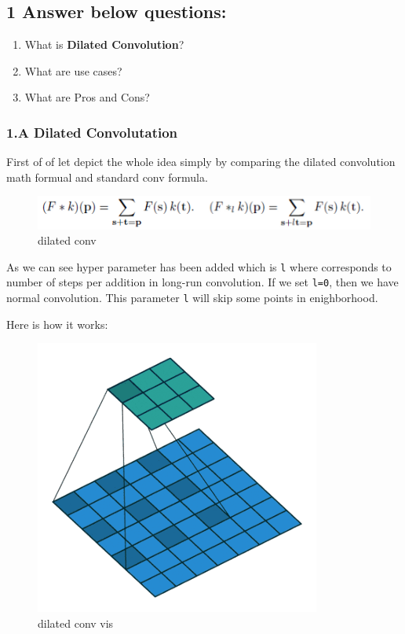 \documentclass[11pt]{article}
\makeatletter
\def\maxwidth{\ifdim\Gin@nat@width>\linewidth\linewidth
    \else\Gin@nat@width\fi}
\let\Oldincludegraphics\includegraphics
\renewcommand{\includegraphics}[1]{\Oldincludegraphics[width=.8\maxwidth]{#1}}
\providecommand{\tightlist}{%
      \setlength{\itemsep}{0pt}\setlength{\parskip}{0pt}}
\makeatother
\begin{document}
    \hypertarget{answer-below-questions}{%
\subsection{1 Answer below questions:}\label{answer-below-questions}}

\begin{enumerate}
\def\labelenumi{\arabic{enumi}.}
\tightlist
\item
  What is \textbf{Dilated Convolution}?
\item
  What are use cases?
\item
  What are Pros and Cons?
\end{enumerate}

    \hypertarget{a-dilated-convolutation}{%
\subsubsection{1.A Dilated
Convolutation}\label{a-dilated-convolutation}}

First of of let depict the whole idea simply by comparing the dilated
convolution math formual and standard conv formula.

\begin{figure}
\centering
\includegraphics{wiki/1_1.png}
\caption{dilated conv}
\end{figure}

As we can see hyper parameter has been added which is \texttt{l} where
corresponds to number of steps per addition in long-run convolution. If
we set \texttt{l=0}, then we have normal convolution. This parameter
\texttt{l} will skip some points in enighborhood.

Here is how it works:

\begin{figure}
\centering
\includegraphics{wiki/1_2.gif}
\caption{dilated conv vis}
\end{figure}
\end{document}
